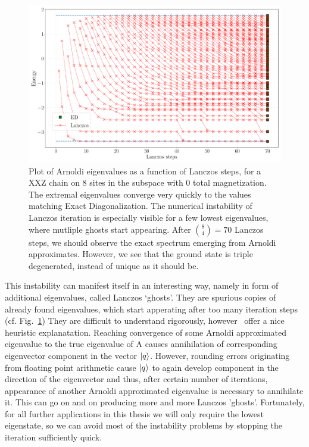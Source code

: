 \begin{figure}[htbp]
	\centering
	\includegraphics[width=\linewidth]{Figures/lanczos_L_8.pdf}
	\caption{Plot of Arnoldi eigenvalues as a function of Lanczos steps, for a XXZ chain on \(8\) sites in the
	subspace with \(0\) total magnetization. The extremal eigenvalues converge very quickly to the values matching
	Exact Diagonalization. The numerical instability of Lanczos iteration is especially visible for a few lowest
	eigenvalues, where mutliple ghosts start appearing. After \(\binom{8}{4} = 70\) Lanczos steps, 
	we should observe the exact spectrum emerging from Arnoldi approximates. However,
	we see that the ground state is triple degenerated, instead of unique as it should be.}
	\label{fig:ghosts}
\end{figure}

This instability can manifest itself in an interesting way, namely in form of additional eigenvalues, called Lanczos `ghosts'.
They are spurious copies of already found eigenvalues, which start apperating after too many iteration steps (cf. Fig.~\ref{fig:ghosts})
They are difficult to understand rigorously, however~\textcite{Trefethen1997} offer a nice heuristic explanatation.
Reaching convergence of some Arnoldi approximated eigenvalue to the true eigenvalue of A causes annihilation
of corresponding eigenvector component in the vector \(\ket{q}\). However, rounding errors originating from
floating point arithmetic cause \(\ket{q}\) to again develop component in the direction of the eigenvector
and thus, after certain number of iterations, appearance of another Arnoldi approximated eigenvalue is necessary
to annihilate it. This can go on and on producing more and more Lanczos 'ghosts'.
Fortunately, for all further applications in this thesis we will only require the lowest eigenstate, so we can
avoid most of the instability problems by stopping the iteration sufficiently quick.

